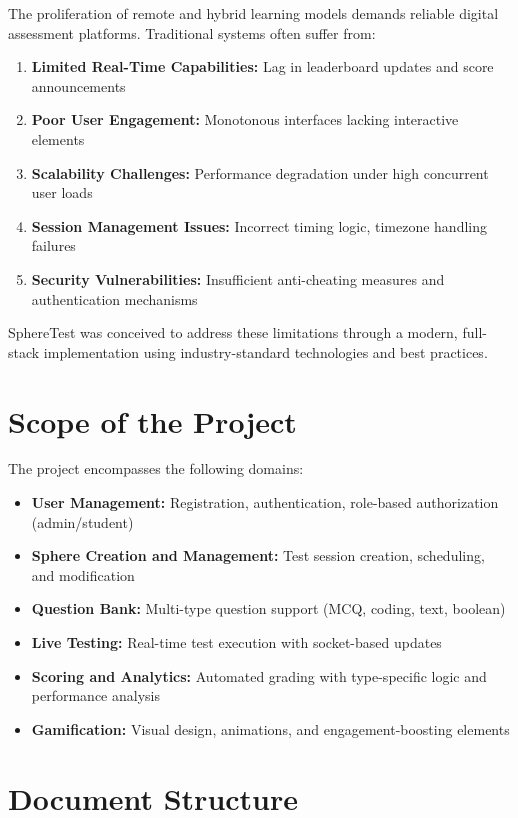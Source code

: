 \documentclass[12pt,a4paper]{report}
\begin{document}
The proliferation of remote and hybrid learning models demands reliable digital assessment platforms. Traditional systems often suffer from:

\begin{enumerate}[left=0pt]
  \item \textbf{Limited Real-Time Capabilities:} Lag in leaderboard updates and score announcements
  \item \textbf{Poor User Engagement:} Monotonous interfaces lacking interactive elements
  \item \textbf{Scalability Challenges:} Performance degradation under high concurrent user loads
  \item \textbf{Session Management Issues:} Incorrect timing logic, timezone handling failures
  \item \textbf{Security Vulnerabilities:} Insufficient anti-cheating measures and authentication mechanisms
\end{enumerate}

SphereTest was conceived to address these limitations through a modern, full-stack implementation using industry-standard technologies and best practices.

\section{Scope of the Project}

The project encompasses the following domains:

\begin{itemize}[left=0pt]
  \item \textbf{User Management:} Registration, authentication, role-based authorization (admin/student)
  \item \textbf{Sphere Creation and Management:} Test session creation, scheduling, and modification
  \item \textbf{Question Bank:} Multi-type question support (MCQ, coding, text, boolean)
  \item \textbf{Live Testing:} Real-time test execution with socket-based updates
  \item \textbf{Scoring and Analytics:} Automated grading with type-specific logic and performance analysis
  \item \textbf{Gamification:} Visual design, animations, and engagement-boosting elements
\end{itemize}

\section{Document Structure}
\end{document}
